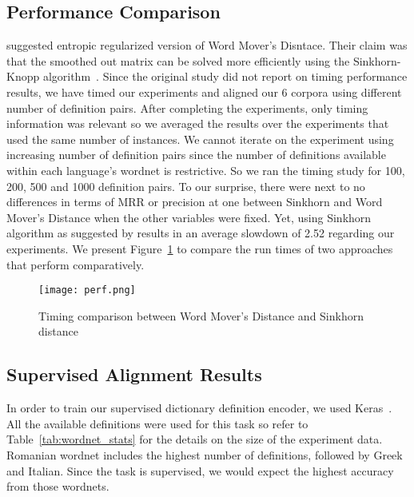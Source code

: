 \subsection{Performance Comparison}%
\label{sub:performance_comparison}

\textcite{balikasCrosslingual2018} suggested entropic regularized version of Word Mover's Disntace.
Their claim was that the smoothed out matrix can be solved more efficiently using the Sinkhorn-Knopp algorithm~\cite{sinkhorn_concerning_1967}.
Since the original study did not report on timing performance results, we have timed our experiments and aligned our 6 corpora using different number of definition pairs.
After completing the experiments, only timing information was relevant so we averaged the results over the experiments that used the same number of instances.
We cannot iterate on the experiment using increasing number of definition pairs since the number of definitions available within each language's wordnet is restrictive.
So we ran the timing study for 100, 200, 500 and 1000 definition pairs.
To our surprise, there were next to no differences in terms of MRR or precision at one between Sinkhorn and Word Mover's Distance when the other variables were fixed.
Yet, using Sinkhorn algorithm as suggested by \citeauthor{balikasCrosslingual2018} results in an average slowdown of 2.52 regarding our experiments.
We present Figure~\ref{fig:perf} to compare the run times of two approaches that perform comparatively.

\begin{figure}[htpb]
    \centering
    \texttt{[image: perf.png]}
    \caption{Timing comparison between Word Mover's Distance and Sinkhorn distance}%
    \label{fig:perf}
\end{figure}

\subsection{Supervised Alignment Results}%
\label{sec:supervised_encoding_results}

In order to train our supervised dictionary definition encoder, we used Keras~\cite{chollet_keras_2015}.
All the available definitions were used for this task so refer to Table~\ref{tab:wordnet_stats} for the details on the size of the experiment data.
Romanian wordnet includes the highest number of definitions, followed by Greek and Italian.
Since the task is supervised, we would expect the highest accuracy from those wordnets.

